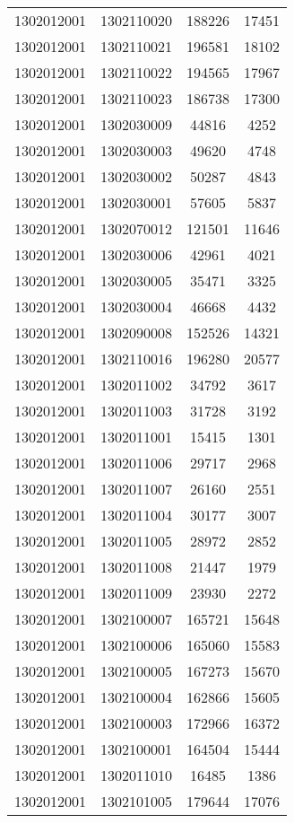 \begin{longtable}[h]{llcc}
		1302012001 & 1302110020 & 188226 & 17451\\
		1302012001 & 1302110021 & 196581 & 18102\\
		1302012001 & 1302110022 & 194565 & 17967\\
		1302012001 & 1302110023 & 186738 & 17300\\
		1302012001 & 1302030009 & 44816 & 4252\\
		1302012001 & 1302030003 & 49620 & 4748\\
		1302012001 & 1302030002 & 50287 & 4843\\
		1302012001 & 1302030001 & 57605 & 5837\\
		1302012001 & 1302070012 & 121501 & 11646\\
		1302012001 & 1302030006 & 42961 & 4021\\
		1302012001 & 1302030005 & 35471 & 3325\\
		1302012001 & 1302030004 & 46668 & 4432\\
		1302012001 & 1302090008 & 152526 & 14321\\
		1302012001 & 1302110016 & 196280 & 20577\\
		1302012001 & 1302011002 & 34792 & 3617\\
		1302012001 & 1302011003 & 31728 & 3192\\
		1302012001 & 1302011001 & 15415 & 1301\\
		1302012001 & 1302011006 & 29717 & 2968\\
		1302012001 & 1302011007 & 26160 & 2551\\
		1302012001 & 1302011004 & 30177 & 3007\\
		1302012001 & 1302011005 & 28972 & 2852\\
		1302012001 & 1302011008 & 21447 & 1979\\
		1302012001 & 1302011009 & 23930 & 2272\\
		1302012001 & 1302100007 & 165721 & 15648\\
		1302012001 & 1302100006 & 165060 & 15583\\
		1302012001 & 1302100005 & 167273 & 15670\\
		1302012001 & 1302100004 & 162866 & 15605\\
		1302012001 & 1302100003 & 172966 & 16372\\
		1302012001 & 1302100001 & 164504 & 15444\\
		1302012001 & 1302011010 & 16485 & 1386\\
		1302012001 & 1302101005 & 179644 & 17076\\

\end{longtable}
